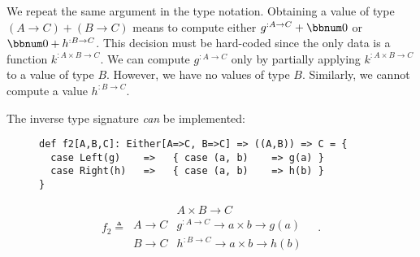 We repeat the same argument in the type notation. Obtaining a value
of type $(A\rightarrow C)+(B\rightarrow C)$ means to compute either
$g^{:A\rightarrow C}+\bbnum 0$ or $\bbnum 0+h^{:B\rightarrow C}$.
This decision must be hard-coded since the only data is a function
$k^{:A\times B\rightarrow C}$. We can compute $g^{:A\rightarrow C}$
only by partially applying $k^{:A\times B\rightarrow C}$ to a value
of type $B$. However, we have no values of type $B$. Similarly,
we cannot compute a value $h^{:B\rightarrow C}$.

The inverse type signature \emph{can} be implemented:

\begin{wrapfigure}{l}{0.55\columnwidth}%
\vspace{0.32\baselineskip}
\begin{lstlisting}
def f2[A,B,C]: Either[A=>C, B=>C] => ((A,B)) => C = {
  case Left(g)    =>   { case (a, b)    => g(a) }
  case Right(h)   =>   { case (a, b)    => h(b) }
}
\end{lstlisting}

\vspace{-2.4\baselineskip}
\end{wrapfigure}%
\vspace{-1.2\baselineskip}

\noindent 
\[
f_{2}\triangleq\,\begin{array}{|c||c|}
 & A\times B\rightarrow C\\
\hline A\rightarrow C & g^{:A\rightarrow C}\rightarrow a\times b\rightarrow g(a)\\
B\rightarrow C & h^{:B\rightarrow C}\rightarrow a\times b\rightarrow h(b)
\end{array}\quad.
\]
\vspace{-0.9\baselineskip}


